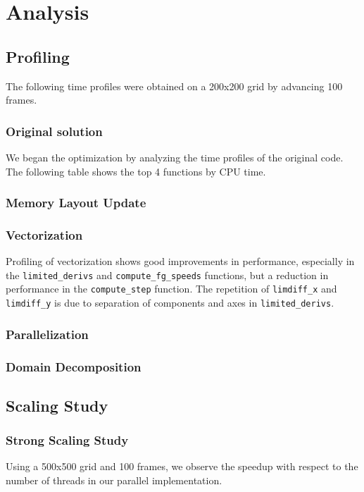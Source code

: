 \documentclass[11pt]{article}
\begin{document}
\section{Analysis}
\subsection{Profiling} \label{sec:prof}

The following time profiles were obtained on a 200x200 grid by advancing 100 frames. 

\subsubsection{Original solution}
We began the optimization by analyzing the time profiles of the original code. The following table shows the top 4 functions by CPU time. 


\subsubsection{Memory Layout Update}

\subsubsection{Vectorization}
Profiling of vectorization shows good improvements in performance, especially in the \texttt{limited\_derivs} and \texttt{compute\_fg\_speeds} functions, but a reduction in performance in the \texttt{compute\_step} function. The repetition of \texttt{limdiff\_x} and \texttt{limdiff\_y} is due to separation of components and axes in \texttt{limited\_derivs}. 


\subsubsection{Parallelization}

\subsubsection{Domain Decomposition}


\subsection{Scaling Study} \label{sec:speedup}


\subsubsection{Strong Scaling Study}
Using a 500x500 grid and 100 frames, we observe the speedup with respect to the number of threads in our parallel implementation.
\end{document}
